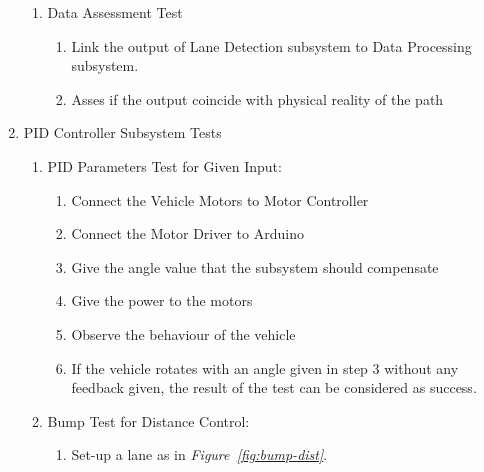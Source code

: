 \documentclass[a4paper,12pt]{article}
\begin{document}
\begin{enumerate}
\begin{enumerate}
\item Data Assessment Test

\begin{enumerate}

\item Link the output of Lane Detection subsystem to Data Processing subsystem.  

\item Asses if the output coincide with physical reality of the path  

\end{enumerate}


\end{enumerate}







\item {PID Controller Subsystem Tests}	

\begin{enumerate}



\item PID Parameters Test for Given Input:	 \label{test:a}	

\begin{enumerate}

\item Connect the Vehicle Motors to Motor Controller  

\item Connect the Motor Driver to Arduino  

\item Give the angle value that the subsystem should compensate   

\item Give the power to the motors  

\item Observe the behaviour of the vehicle  

\item If the vehicle rotates with an angle given in step 3 without any feedback given, the result of the test can be considered as success.  

\end{enumerate}


\item Bump Test for Distance Control: \label{test:b}	

\begin{enumerate}

\item Set-up a lane as in \textit{Figure~\ref{fig:bump-dist}}.


\end{enumerate}
\end{enumerate}
\end{enumerate}
\end{document}
